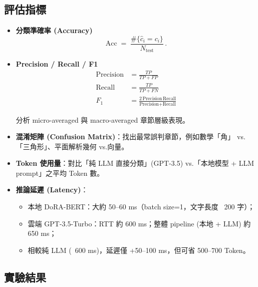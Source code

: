 \documentclass[10pt,conference]{IEEEtran}
\begin{document}
\begin{CJK}{UTF8}{bsmi}
\subsection{評估指標}
\begin{itemize}
  \item \textbf{分類準確率 (Accuracy)}  
    \[
      \mathrm{Acc} \;=\; \frac{\#\{\hat{c}_i = c_i\}}{N_\text{test}}\,.
    \]
  \item \textbf{Precision / Recall / F1}  
    \begin{align}
      \text{Precision} &= \frac{TP}{TP + FP} \nonumber \\
      \text{Recall}    &= \frac{TP}{TP + FN} \nonumber \\
      F_1              &= \frac{2\,\text{Precision}\,\text{Recall}}{\text{Precision} + \text{Recall}} \nonumber
    \end{align}

    分析 micro-averaged 與 macro-averaged 章節層級表現。  
  \item \textbf{混淆矩陣 (Confusion Matrix)}：找出最常誤判章節，例如數學「角」 vs.「三角形」、平面解析幾何 vs.向量。  
  \item \textbf{Token 使用量}：對比「純 LLM 直接分類」(GPT-3.5) vs.「本地模型 + LLM prompt」之平均 Token 數。  
  \item \textbf{推論延遲 (Latency)}：  
    \begin{itemize}
      \item 本地 DoRA-BERT：大約 50–60 ms（batch size=1，文字長度 ~200 字）；  
      \item 雲端 GPT-3.5-Turbo：RTT 約 600 ms；整體 pipeline (本地 + LLM) 約 650 ms；  
      \item 相較純 LLM (~600 ms)，延遲僅 +50–100 ms，但可省 500–700 Token。
    \end{itemize}
\end{itemize}

\subsection{實驗結果}



\end{CJK}
\end{document}
